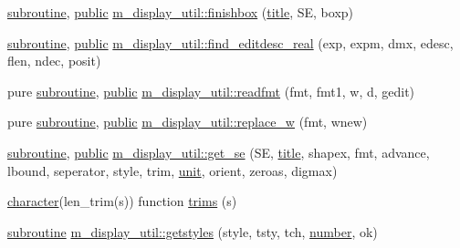 \begin{DoxyCompactItemize}
\item 
\hyperlink{M__stopwatch_83_8txt_acfbcff50169d691ff02d4a123ed70482}{subroutine}, \hyperlink{M__stopwatch_83_8txt_a2f74811300c361e53b430611a7d1769f}{public} \hyperlink{namespacem__display__util_a056732cc150994b9abe25ed0d72ebee4}{m\+\_\+display\+\_\+util\+::finishbox} (\hyperlink{print__watch_83_8txt_a15b5bd21156bb9fca6a755ab8c029a9c}{title}, SE, boxp)
\item 
\hyperlink{M__stopwatch_83_8txt_acfbcff50169d691ff02d4a123ed70482}{subroutine}, \hyperlink{M__stopwatch_83_8txt_a2f74811300c361e53b430611a7d1769f}{public} \hyperlink{namespacem__display__util_abcd2aebb4cd373005b4d1fc4359a2d01}{m\+\_\+display\+\_\+util\+::find\+\_\+editdesc\+\_\+real} (exp, expm, dmx, edesc, flen, ndec, posit)
\item 
pure \hyperlink{M__stopwatch_83_8txt_acfbcff50169d691ff02d4a123ed70482}{subroutine}, \hyperlink{M__stopwatch_83_8txt_a2f74811300c361e53b430611a7d1769f}{public} \hyperlink{namespacem__display__util_a73ae4e30d2dcf1f608ac24bf1623ee6c}{m\+\_\+display\+\_\+util\+::readfmt} (fmt, fmt1, w, d, gedit)
\item 
pure \hyperlink{M__stopwatch_83_8txt_acfbcff50169d691ff02d4a123ed70482}{subroutine}, \hyperlink{M__stopwatch_83_8txt_a2f74811300c361e53b430611a7d1769f}{public} \hyperlink{namespacem__display__util_a76a458454b83026c12d4a90882f2719e}{m\+\_\+display\+\_\+util\+::replace\+\_\+w} (fmt, wnew)
\item 
\hyperlink{M__stopwatch_83_8txt_acfbcff50169d691ff02d4a123ed70482}{subroutine}, \hyperlink{M__stopwatch_83_8txt_a2f74811300c361e53b430611a7d1769f}{public} \hyperlink{namespacem__display__util_a04585c4fe921b2423a6cfc1ad21a40b7}{m\+\_\+display\+\_\+util\+::get\+\_\+se} (SE, \hyperlink{print__watch_83_8txt_a15b5bd21156bb9fca6a755ab8c029a9c}{title}, shapex, fmt, advance, lbound, seperator, style, trim, \hyperlink{M__stopwatch_83_8txt_a5cbef30eb7c0d734bd82f5a7ebea9aa7}{unit}, orient, zeroas, digmax)
\item 
\hyperlink{option__stopwatch_83_8txt_abd4b21fbbd175834027b5224bfe97e66}{character}(len\+\_\+trim(s)) function \hyperlink{M__display_8f90_a18d4b146c386b49bb8b6512c91988ae3}{trims} (s)
\item 
\hyperlink{M__stopwatch_83_8txt_acfbcff50169d691ff02d4a123ed70482}{subroutine} \hyperlink{namespacem__display__util_a692b7279b1883d8139b60e480aa1e430}{m\+\_\+display\+\_\+util\+::getstyles} (style, tsty, tch, \hyperlink{what__overview_81_8txt_a5168680dcac08de182f59de9a12c38ae}{number}, ok)
\item 

\end{DoxyCompactItemize}
